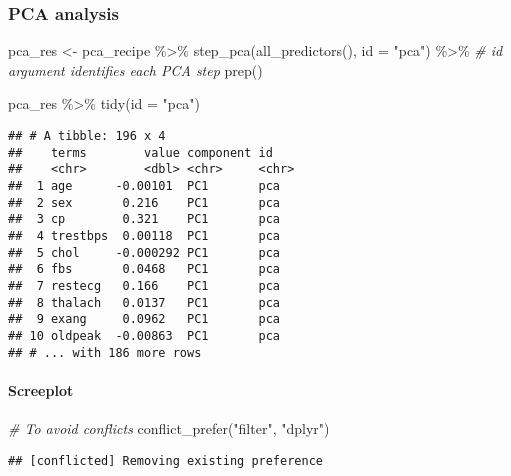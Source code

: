\documentclass[
]{book}
\newenvironment{Shaded}{\begin{snugshade}}{\end{snugshade}}
\newcommand{\AttributeTok}[1]{\textcolor[rgb]{0.77,0.63,0.00}{#1}}
\newcommand{\CommentTok}[1]{\textcolor[rgb]{0.56,0.35,0.01}{\textit{#1}}}
\newcommand{\FunctionTok}[1]{\textcolor[rgb]{0.00,0.00,0.00}{#1}}
\newcommand{\NormalTok}[1]{#1}
\newcommand{\OtherTok}[1]{\textcolor[rgb]{0.56,0.35,0.01}{#1}}
\newcommand{\SpecialCharTok}[1]{\textcolor[rgb]{0.00,0.00,0.00}{#1}}
\newcommand{\StringTok}[1]{\textcolor[rgb]{0.31,0.60,0.02}{#1}}
\begin{document}
\hypertarget{pca-analysis}{%
\subsubsection{PCA analysis}\label{pca-analysis}}

\begin{Shaded}
\begin{Highlighting}[]
\NormalTok{pca\_res }\OtherTok{\textless{}{-}}\NormalTok{ pca\_recipe }\SpecialCharTok{\%\textgreater{}\%} 
  \FunctionTok{step\_pca}\NormalTok{(}\FunctionTok{all\_predictors}\NormalTok{(), }
           \AttributeTok{id =} \StringTok{"pca"}\NormalTok{) }\SpecialCharTok{\%\textgreater{}\%} \CommentTok{\# id argument identifies each PCA step }
  \FunctionTok{prep}\NormalTok{()}

\NormalTok{pca\_res }\SpecialCharTok{\%\textgreater{}\%}
  \FunctionTok{tidy}\NormalTok{(}\AttributeTok{id =} \StringTok{"pca"}\NormalTok{) }
\end{Highlighting}
\end{Shaded}

\begin{verbatim}
## # A tibble: 196 x 4
##    terms        value component id   
##    <chr>        <dbl> <chr>     <chr>
##  1 age      -0.00101  PC1       pca  
##  2 sex       0.216    PC1       pca  
##  3 cp        0.321    PC1       pca  
##  4 trestbps  0.00118  PC1       pca  
##  5 chol     -0.000292 PC1       pca  
##  6 fbs       0.0468   PC1       pca  
##  7 restecg   0.166    PC1       pca  
##  8 thalach   0.0137   PC1       pca  
##  9 exang     0.0962   PC1       pca  
## 10 oldpeak  -0.00863  PC1       pca  
## # ... with 186 more rows
\end{verbatim}

\hypertarget{screeplot}{%
\paragraph{Screeplot}\label{screeplot}}

\begin{Shaded}
\begin{Highlighting}[]
\CommentTok{\# To avoid conflicts }
\FunctionTok{conflict\_prefer}\NormalTok{(}\StringTok{"filter"}\NormalTok{, }\StringTok{"dplyr"}\NormalTok{) }
\end{Highlighting}
\end{Shaded}

\begin{verbatim}
## [conflicted] Removing existing preference
\end{verbatim}
\end{document}
